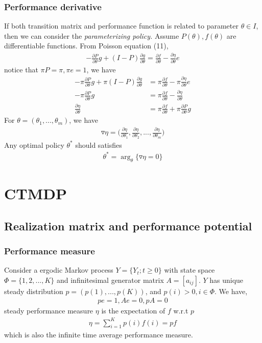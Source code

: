\documentclass[runningheads]{llncs}
\begin{document}
    \subsubsection{Performance derivative}
    If both transition matrix and performance function is related to
    parameter $\theta \in I$, then we can consider the
    \emph{parameterizing policy.}
    Assume $P(\theta), f(\theta)$ are differentiable functions.
    From Poisson equation (11),
    \begin{align}
        - \frac{\partial P}{\partial \theta} g + (I - P) \frac{\partial g}{\partial \theta} = \frac{\partial f}{\partial \theta} - \frac{\partial \eta}{\partial \theta}e
    \end{align}
    notice that $\pi P =  \pi, \pi e = 1$, we have
    \begin{align}
        - \pi \frac{\partial P}{\partial \theta} g + \pi (I - P) \frac{\partial g}{\partial \theta} &= \pi\frac{\partial f}{\partial \theta} - \pi\frac{\partial \eta}{\partial \theta}e \\
        - \pi \frac{\partial P}{\partial \theta} g &= \pi\frac{\partial f}{\partial \theta} - \frac{\partial \eta}{\partial \theta} \\
       \frac{\partial \eta}{\partial \theta}  &= \pi\frac{\partial f}{\partial \theta} + \pi \frac{\partial P}{\partial \theta} g
    \end{align}
    For $\theta = (\theta_1,...,\theta_m)$, we have
    \begin{align}
        \triangledown \eta = \Big( \frac{\partial \eta}{\partial \theta_1}, \frac{\partial \eta}{\partial \theta_2},..., \frac{\partial \eta}{\partial \theta_m} \Big)
    \end{align} 
    Any optimal policy $\theta^*$ should satisfies
    \begin{align}
        \theta^* = \mathop{\arg}_{\theta} \{ \triangledown \eta = 0 \}
    \end{align}

    \section{CTMDP}
    \subsection{Realization matrix and performance potential}
    \subsubsection{Performance measure}
    Consider a ergodic Markov process $Y = \{ Y_t; t \geq 0 \}$ with
    state space $\Phi = \{ 1, 2,..., K \}$ and infinitesimal generator
    matrix $A = [a_{ij}]$. $Y$ has unique steady distribution
    $p = (p(1),..., p(K))$, and $p(i) > 0, i \in \Phi$. We have,
    \begin{align}
        pe = 1, Ae = 0, pA = 0
    \end{align}
    steady performance measure $\eta$ is the expectation of $f$ w.r.t $p$
    \begin{align}
        \eta = \sum_{i = 1}^K p(i) f(i) = pf
    \end{align}
    which is also the infinite time average performance measure.
\end{document}

